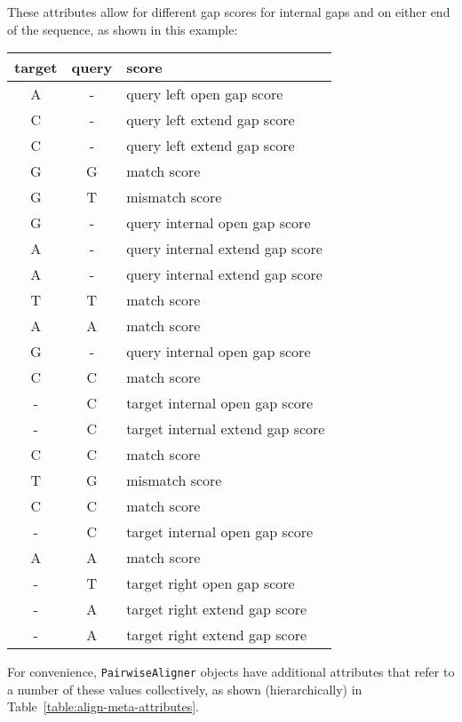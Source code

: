 These attributes allow for different gap scores for internal gaps and on either end of the sequence, as shown in this example:

\begin{table}[h]
\begin{tabular}{|c|c|l|}
\hline
\textbf{target} & \textbf{query} & \textbf{score} \\
\hline
A & - &  query left open gap score \\
C & - &  query left extend gap score \\
C & - &  query left extend gap score \\
G & G &  match score \\
G & T &  mismatch score \\
G & - &  query internal open gap score \\
A & - &  query internal extend gap score \\
A & - &  query internal extend gap score \\
T & T &  match score \\
A & A &  match score \\
G & - &  query internal open gap score \\
C & C &  match score \\
- & C &  target internal open gap score \\
- & C &  target internal extend gap score \\
C & C &  match score \\
T & G &  mismatch score \\
C & C &  match score \\
- & C &  target internal open gap score \\
A & A &  match score \\
- & T &  target right open gap score \\
- & A &  target right extend gap score \\
- & A &  target right extend gap score \\
\hline
\end{tabular}
\end{table}

For convenience, \verb+PairwiseAligner+ objects have additional attributes that refer to a number of these values collectively, as shown (hierarchically) in Table~\ref{table:align-meta-attributes}.

